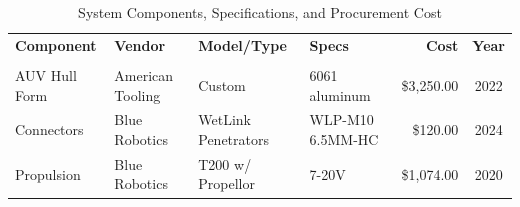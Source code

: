 \documentclass[conference]{IEEEtran}
\begin{document}
\begin{table}[htbp] %
\centering
\caption{System Components, Specifications, and Procurement Cost}
\label{table:system_components}
\renewcommand{\arraystretch}{1.5}
\begin{tabularx}{\textwidth}{@{} l l Y Y r c @{}}
    \toprule
        \textbf{Component}      & \textbf{Vendor}               & \textbf{Model/Type} & \textbf{Specs}   & \textbf{Cost} & \textbf{Year} \\ 
        \addlinespace[0.8em]
         \\
        \midrule
        AUV Hull Form           & American Tooling              & Custom              & 6061 aluminum    & \$3,250.00 & 2022             \\ 
        Connectors              & Blue Robotics                 & WetLink Penetrators & WLP-M10 6.5MM-HC & \$120.00   & 2024             \\ 
        Propulsion              & Blue Robotics                 & T200 w/ Propellor   & 7-20V            & \$1,074.00 & 2020             \\ 
        

\end{tabularx}
\end{table}
\end{document}
